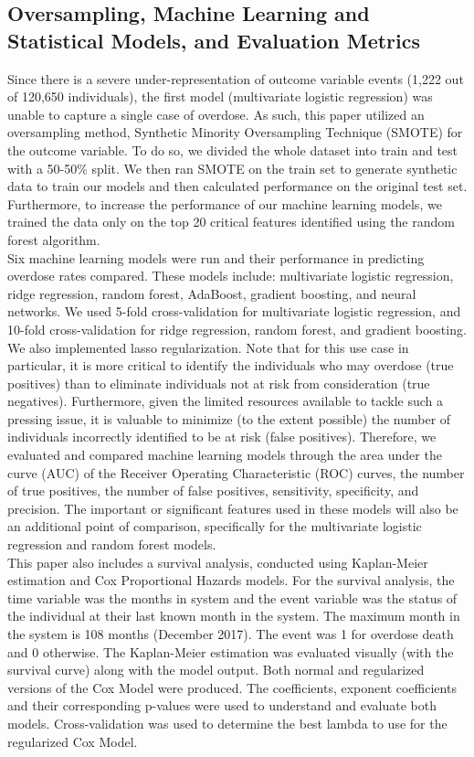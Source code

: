 \documentclass[twoside,10.5pt]{article}
\begin{document}
\subsection{Oversampling, Machine Learning and Statistical Models, and Evaluation Metrics}
Since there is a severe under-representation of outcome variable events (1,222 out of 120,650 individuals), the first model (multivariate logistic regression) was unable to capture a single case of overdose. As such, this paper utilized an oversampling method, Synthetic Minority Oversampling Technique (SMOTE) for the outcome variable. To do so, we divided the whole dataset into train and test with a 50-50\% split. We then ran SMOTE on the train set to generate synthetic data to train our models and then calculated performance on the original test set. Furthermore, to increase the performance of our machine learning models, we trained the data only on the top 20 critical features identified using the random forest algorithm.\\

Six machine learning models were run and their performance in predicting overdose rates compared. These models include: multivariate logistic regression, ridge regression, random forest, AdaBoost, gradient boosting, and neural networks. We used 5-fold cross-validation for multivariate logistic regression, and 10-fold cross-validation for ridge regression, random forest, and gradient boosting. We also implemented lasso regularization. Note that for this use case in particular, it is more critical to identify the individuals who may overdose (true positives) than to eliminate individuals not at risk from consideration (true negatives). Furthermore, given the limited resources available to tackle such a pressing issue, it is valuable to minimize (to the extent possible) the number of individuals incorrectly identified to be at risk (false positives). Therefore, we evaluated and compared machine learning models through the area under the curve (AUC) of the Receiver Operating Characteristic (ROC) curves, the number of true positives, the number of false positives, sensitivity, specificity, and precision. The important or significant features used in these models will also be an additional point of comparison, specifically for the multivariate logistic regression and random forest models.\\

This paper also includes a survival analysis, conducted using Kaplan-Meier estimation and Cox Proportional Hazards models. For the survival analysis, the time variable was the months in system and the event variable was the status of the individual at their last known month in the system. The maximum month in the system is 108 months (December 2017). The event was 1 for overdose death and 0 otherwise. The Kaplan-Meier estimation was evaluated visually (with the survival curve) along with the model output. Both normal and regularized versions of the Cox Model were produced. The coefficients, exponent coefficients and their corresponding p-values were used to understand and evaluate both models. Cross-validation was used to determine the best lambda to use for the regularized Cox Model. 
\end{document}

